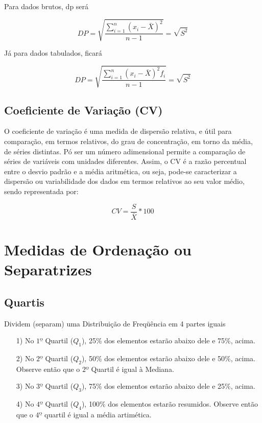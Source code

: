 Para dados brutos, dp será

\begin{equation}\label{dp}
    DP= \sqrt{\frac{\sum_{i=1}^{n}(x_{i}-\bar{X})^{2}}{n-1}} = \sqrt{S^{2}}
\end{equation}

Já para dados tabulados, ficará

\begin{equation}\label{dp}
    DP= \sqrt{\frac{\sum_{i=1}^{n}(x_{i}-\bar{X})^{2}f_{i}}{n-1}} = \sqrt{S^{2}}
\end{equation}

\subsection{Coeficiente de Variação (CV)}

O coeficiente de variação é uma medida de dispersão relativa, e útil para comparação, em termos relativos, do grau de concentração, em torno da média, de séries distintas. Pó ser um número adimensional permite a comparação de séries de variáveis com unidades diferentes. Assim, o CV é a razão percentual entre o desvio padrão e a média aritmética, ou seja, pode-se caracterizar a dispersão ou variabilidade dos dados em termos relativos ao seu valor médio, sendo representada por:


\begin{equation}\label{CV}
    CV= \frac{S}{\bar{X}}*100
\end{equation}

\newpage

\section{Medidas de Ordenação ou Separatrizes}

\subsection{Quartis}

Dividem (separam) uma Distribuição de Freqüência em 4 partes iguais

\begin{enumerate}
  \item[{1)}] No $1º$ Quartil ($Q_{1}$), 25\% dos elementos estarão abaixo dele e 75\%, acima.
  \item[{2)}] No $2º$ Quartil ($Q_{2}$), 50\% dos elementos estarão abaixo dele e 50\%, acima. \vskip0.3cm
 Observe então que o $2º$ Quartil é igual à Mediana.
  \item[{3)}] No $3º$ Quartil ($Q_{3}$), 75\% dos elementos estarão abaixo dele e 25\%, acima.
  \vskip0.3cm
 \item[{4)}] No $4º$ Quartil ($Q_{4}$), 100\% dos elementos estarão resumidos.
  Observe então que o $4º$ quartil é igual a média artimética.
\end{enumerate}


